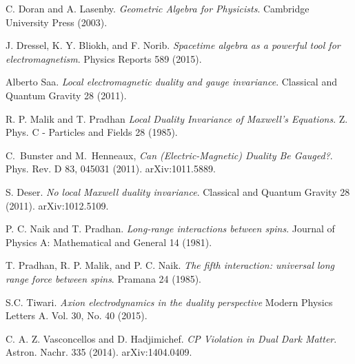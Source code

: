 \documentclass{article}
\begin{document}
  \begin{thebibliography}{9} 
      C. Doran and A. Lasenby.
      \emph{Geometric Algebra for Physicists}. Cambridge University Press (2003).

      J. Dressel, K. Y. Bliokh, and F. Norib.
      \emph{Spacetime algebra as a powerful tool for electromagnetism}.
      Physics Reports 589 (2015).

      Alberto Saa.
      \emph{Local electromagnetic duality and gauge invariance}.
      Classical and Quantum Gravity 28 (2011).

      R. P. Malik and T. Pradhan 
      \emph{Local Duality Invariance of Maxwell's Equations}.
      Z. Phys. C - Particles and Fields 28 (1985).

      C.~Bunster and M.~Henneaux,
        \emph{Can (Electric-Magnetic) Duality Be Gauged?}.
        Phys. Rev. D 83, 045031 (2011).
        arXiv:1011.5889.

        S. Deser.
        \emph{No local Maxwell duality invariance}.
        Classical and Quantum Gravity
        28 (2011).
        arXiv:1012.5109.

      P. C. Naik and T. Pradhan.
      \emph{Long-range interactions between spins}.
      Journal of Physics A: Mathematical and General 14 (1981).

      T. Pradhan, R. P. Malik, and P. C. Naik.
      \emph{The fifth interaction: universal long range force between spins}.
      Pramana 24 (1985). 

      S.C. Tiwari.
      \emph{Axion electrodynamics in the duality perspective}
      Modern Physics Letters A.
      Vol. 30, No. 40 (2015).

      C. A. Z. Vasconcellos and D. Hadjimichef.
      \emph{CP Violation in Dual Dark Matter}.
      Astron. Nachr. 335 (2014).
      arXiv:1404.0409.

  \end{thebibliography}
\end{document}
